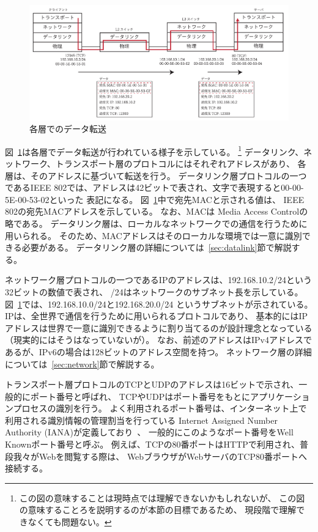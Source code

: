 \begin{figure}[tb]
    \centering
    \includegraphics[width=14cm,pagebox=artbox]{figs/osi_link.pdf}
    \caption{各層でのデータ転送}
    \label{fig:osi_link}
\end{figure}

図~\ref{fig:osi_link}は各層でデータ転送が行われている様子を示している。
\footnote{
この図の意味することは現時点では理解できないかもしれないが、
この図の意味することろを説明するのが本節の目標であるため、
現段階で理解できなくても問題ない。
}
データリンク、ネットワーク、トランスポート層のプロトコルにはそれぞれアドレスがあり、
各層は、そのアドレスに基づいて転送を行う。
データリンク層プロトコルの一つであるIEEE 802では、アドレスは42ビットで表され、文字で表現すると00-00-5E-00-53-02といった
表記になる。
図~\ref{fig:osi_link}中で宛先MACと示される値は、
IEEE 802の宛先MACアドレスを示している。
なお、MACは Media Access Controlの略である。
データリンク層は、ローカルなネットワークでの通信を行うために用いられる。
そのため、MACアドレスはそのローカルな環境では一意に識別できる必要がある。
データリンク層の詳細については~\ref{sec:datalink}節で解説する。

ネットワーク層プロトコルの一つであるIPのアドレスは、192.168.10.2/24という32ビットの数値で表され、
/24はネットワークのサブネット長を示している。
図~\ref{fig:osi_link}では、192.168.10.0/24と192.168.20.0/24
というサブネットが示されている。
IPは、全世界で通信を行うために用いられるプロトコルであり、
基本的にはIPアドレスは世界で一意に識別できるように割り当てるのが設計理念となっている
（現実的にはそうはなっていないが）。
なお、前述のアドレスはIPv4アドレスであるが、IPv6の場合は128ビットのアドレス空間を持つ。
ネットワーク層の詳細については~\ref{sec:network}節で解説する。

トランスポート層プロトコルのTCPとUDPのアドレスは16ビットで示され、一般的にポート番号と呼ばれ、
TCPやUDPはポート番号をもとにアプリケーションプロセスの識別を行う。
よく利用されるポート番号は、インターネット上で利用される識別情報の管理割当を行っている
Internet Assigned Number Authority (IANA)が定義しており~\cite{wellknown}、
一般的にこのようなポート番号をWell Knownポート番号と呼ぶ。
例えば、TCPの80番ポートはHTTPで利用され、普段我々がWebを閲覧する際は、
WebブラウザがWebサーバのTCP80番ポートへ接続する。

